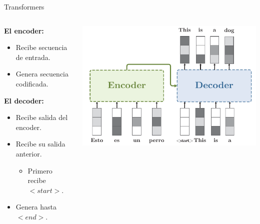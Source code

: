 \documentclass[aspectratio=169]{beamer}
\begin{document}
\begin{frame}{Transformers}
  \begin{columns}
    \begin{column}{.4\textwidth}
      \textbf{El encoder:}
      \begin{itemize}
        \item Recibe secuencia de entrada.
        \item Genera secuencia codificada.
      \end{itemize}
      \vspace{.5cm}
      \textbf{El decoder:}
      \begin{itemize}
        \item Recibe salida del encoder.
        \item Recibe su salida anterior.
        \begin{itemize}
          \item Primero recibe \emph{$<start>$}.
        \end{itemize}
        \item Genera hasta \emph{$<end>$}.
      \end{itemize}
    \end{column}
    \begin{column}{.6\textwidth}
      \includegraphics[width=\textwidth, center]{imgs/tema4/att/Transformer_all_s4.pdf}
    \end{column}
  \end{columns}
\end{frame}
\end{document}
